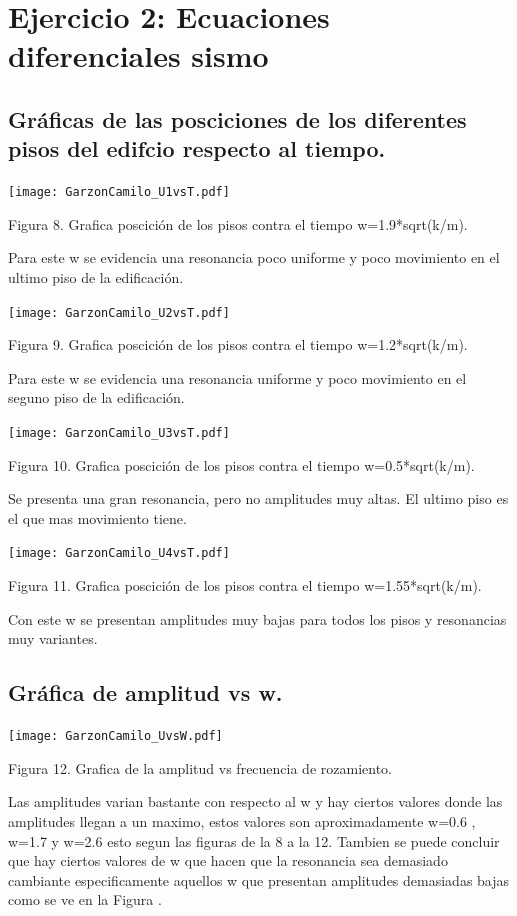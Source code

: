 \documentclass{article}
\begin{document}
\section{Ejercicio 2: Ecuaciones diferenciales sismo} 
\vspace{5mm}
\subsection{    Gráficas de las posciciones de los diferentes pisos del edifcio respecto al tiempo.} 
\vspace{5mm}
\begin{center}
\texttt{[image: GarzonCamilo\_U1vsT.pdf]} 

Figura 8. Grafica poscición de los pisos contra el tiempo w=1.9*sqrt(k/m).
\begin{flushleft}
Para este w se evidencia una resonancia poco uniforme y poco movimiento en el ultimo piso de la edificación.
\end{flushleft}
\texttt{[image: GarzonCamilo\_U2vsT.pdf]} 

Figura 9. Grafica poscición de los pisos contra el tiempo w=1.2*sqrt(k/m).
\begin{flushleft}
Para este w se evidencia una resonancia uniforme y poco movimiento en el seguno piso de la edificación.
\end{flushleft}
\texttt{[image: GarzonCamilo\_U3vsT.pdf]} 


Figura 10. Grafica poscición de los pisos contra el tiempo w=0.5*sqrt(k/m).
\begin{flushleft}
Se presenta una gran resonancia, pero no amplitudes muy altas. El ultimo piso es el que mas movimiento tiene.
\end{flushleft}
\texttt{[image: GarzonCamilo\_U4vsT.pdf]} 


Figura 11. Grafica poscición de los pisos contra el tiempo w=1.55*sqrt(k/m).
\begin{flushleft}
Con este w se presentan amplitudes muy bajas para todos los pisos y resonancias muy variantes.
\end{flushleft}
\end{center}
\vspace{5mm}
\subsection{    Gráfica de amplitud vs w.} 
\vspace{5mm}
\begin{center}
\texttt{[image: GarzonCamilo\_UvsW.pdf]} 

Figura 12. Grafica de la amplitud vs frecuencia de rozamiento.

\begin{flushleft}
Las amplitudes varian  bastante con respecto al w y hay ciertos valores donde las amplitudes llegan a un maximo, estos valores son aproximadamente w=0.6 , w=1.7 y w=2.6 esto segun las figuras de la 8 a la 12. Tambien se puede concluir que hay ciertos valores de w que hacen que la resonancia sea demasiado cambiante especificamente aquellos w que presentan amplitudes demasiadas bajas como se ve en la Figura .
\end{flushleft}
\end{center}
\end{document}
